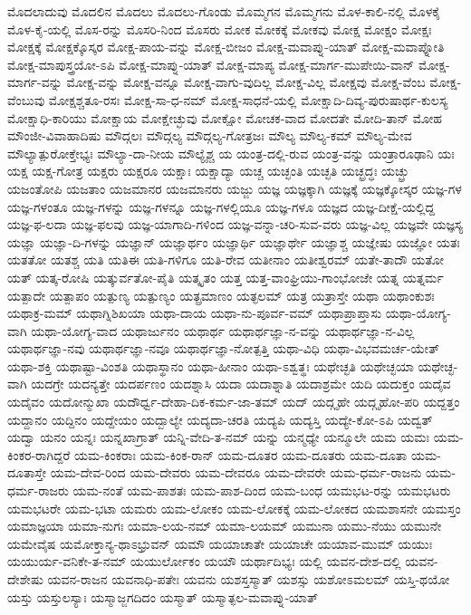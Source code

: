 {ಮೊದಲಾದುವು
ಮೊದಲಿನ
ಮೊದಲು
ಮೊದಲು-ಗೊಂಡು
ಮೊಮ್ಮಗನ
ಮೊಮ್ಮಗನು
ಮೊಳ-ಕಾಲಿ-ನಲ್ಲಿ
ಮೊಳಕೈ
ಮೊಳ-ಕೈ-ಯಲ್ಲಿ
ಮೊಸ-ರನ್ನು
ಮೊಸರಿ-ನಿಂದ
ಮೊಸರು
ಮೋಕ
ಮೋಕಕ್ಕೆ
ಮೋಕವು
ಮೋಕ್ಷ
ಮೋಕ್ಷಂ
ಮೋಕ್ಷಃ
ಮೋಕ್ಷಕ್ಕೆ
ಮೋಕ್ಷಕ್ಕೊಸ್ಕರ
ಮೋಕ್ಷ-ಪಾಯ-ವನ್ನು
ಮೋಕ್ಷ-ಬೀಜಂ
ಮೋಕ್ಷ-ಮವಾಪ್ನು-ಯಾತ್
ಮೋಕ್ಷ-ಮವಾಪ್ನೋತಿ
ಮೋಕ್ಷ-ಮಾಪುಸ್ತ್ರಯೋ-ಽಪಿ
ಮೋಕ್ಷ-ಮಾಪ್ನು-ಯಾತ್
ಮೋಕ್ಷ-ಮಾಪ್ಯ
ಮೋಕ್ಷ-ಮಾರ್ಗ-ಮುಪೇಯಿ-ವಾನ್
ಮೋಕ್ಷ-ಮಾರ್ಗ-ವನ್ನು
ಮೋಕ್ಷ-ವನ್ನು
ಮೋಕ್ಷ-ವನ್ನೂ
ಮೋಕ್ಷ-ವಾಗು-ವುದಿಲ್ಲ
ಮೋಕ್ಷ-ವಿಲ್ಲ
ಮೋಕ್ಷವು
ಮೋಕ್ಷ-ವೆಂಬ
ಮೋಕ್ಷ-ವೆಂಬುವು
ಮೋಕ್ಷಶ್ಚತೂ-ರಸಃ
ಮೋಕ್ಷ-ಸಾ-ಧ-ನಮ್
ಮೋಕ್ಷ-ಸಾಧನೆ-ಯಲ್ಲಿ
ಮೋಕ್ಷಾದಿ-ದಿವ್ಯ-ಪುರುಷಾರ್ಥ-ಕುಲಸ್ಯ
ಮೋಕ್ಷಾಧಿ-ಕಾರಿಯು
ಮೋಕ್ಷಾಯ
ಮೋಕ್ಷೇಚ್ಛುವು
ಮೋಕ್ಷೋ
ಮೋಚಕ-ವಾದ
ಮೋದತೇ
ಮೋದಿ-ತಾನ್
ಮೋಹ
ಮೌಂಜೀ-ವಿವಾಹಾದಿಷು
ಮೌದ್ಗಲಃ
ಮೌದ್ಗಲ್ಯ
ಮೌದ್ಗಲ್ಯ-ಗೋತ್ರಜಃ
ಮೌಲ್ಯ
ಮೌಲ್ಯ-ಕಮ್
ಮೌಲ್ಯ-ಮೇವ
ಮೌಲ್ಯಾತ್ಪುರೋಕ್ತೇಭ್ಯಃ
ಮೌಲ್ಯಾ-ದಾ-ನೀಯ
ಮೌಲ್ಯೈಶ್ಚ
ಯ
ಯಂತ್ರ-ದಲ್ಲಿ-ರುವ
ಯಂತ್ರ-ವನ್ನು
ಯಂತ್ರಾರೂಢಾನಿ
ಯಃ
ಯಕ್ಷ
ಯಕ್ಷ-ಗೋತ್ರ
ಯಕ್ಷರು
ಯಕ್ಷರೂ
ಯಕ್ಷಾಃ
ಯಕ್ಷಾದ್ಯಾ
ಯಚ್ಚ
ಯಚ್ಛಂತಿ
ಯಚ್ಛತಿ
ಯಚ್ಛ್ರದ್ಧಃ
ಯಚ್ಛ್ರು
ಯಜಂತೋಪಿ
ಯಜತಾಂ
ಯಜಮಾನರ
ಯಜಮಾನರು
ಯಜ್ಜು
ಯಜ್ಞ
ಯಜ್ಞಕ್ಕಾಗಿ
ಯಜ್ಞಕ್ಕೆ
ಯಜ್ಞಕ್ಕೋಸ್ಕರ
ಯಜ್ಞ-ಗಳ
ಯಜ್ಞ-ಗಳಂತೂ
ಯಜ್ಞ-ಗಳನ್ನು
ಯಜ್ಞ-ಗಳನ್ನೂ
ಯಜ್ಞ-ಗಳಲ್ಲಿಯೂ
ಯಜ್ಞ-ಗಳೂ
ಯಜ್ಞದ
ಯಜ್ಞ-ದೀಕ್ಷೆ-ಯಲ್ಲಿದ್ದ
ಯಜ್ಞ-ಫ-ಲದಾ
ಯಜ್ಞ-ಫಲವು
ಯಜ್ಞ-ಯಾಗಾದಿ-ಗಳಿಂದ
ಯಜ್ಞ-ವನ್ನಾ-ಚರಿ-ಸುವ-ವರು
ಯಜ್ಞ-ವಿಲ್ಲ
ಯಜ್ಞವೇ
ಯಜ್ಞಸ್ಯ
ಯಜ್ಞಾ
ಯಜ್ಞಾ-ದಿ-ಗಳನ್ನು
ಯಜ್ಞಾನ್
ಯಜ್ಞಾರ್ಥಂ
ಯಜ್ಞಾರ್ಥಿ
ಯಜ್ಞಾರ್ಥೇ
ಯಜ್ಞಾಶ್ಚ
ಯಜ್ಞೇಷು
ಯಜ್ಞೋ
ಯತಃ
ಯತತೋ
ಯತಶ್ಚ
ಯತಿ
ಯತಿಈ
ಯತಿ-ಗಳಿಗೂ
ಯತಿ-ರೇವ
ಯತೀನಾಂ
ಯತೀಶ್ವರಮ್
ಯತೇ-ತಾದೌ
ಯತೋ
ಯತ್
ಯತ್ಕ-ರೋಷಿ
ಯತ್ಕುರ್ವತೋ-ಪೈತಿ
ಯತ್ಕೃತಂ
ಯತ್ತ
ಯತ್ತ-ವಾಂಘ್ರಿಯು-ಗಾಂಭೋಜೇ
ಯತ್ನ
ಯತ್ನರ್ಮ
ಯತ್ಪಾದೇ
ಯತ್ಪಾಪಂ
ಯತ್ಪುಣ್ಯ
ಯತ್ಪುಣ್ಯಂ
ಯತ್ಪ್ರಮಾಣಂ
ಯತ್ಫಲಮ್
ಯತ್ರ
ಯತ್ರಾಸ್ತೇ
ಯಥಾ
ಯಥಾಂಕುಶಃ
ಯಥಾಕ್ರ-ಮಮ್
ಯಥಾಗ್ನಿಶಿಖಯಾ
ಯಥಾ-ದಾಯ
ಯಥಾ-ನು-ಪೂರ್ವ-ವಮ್
ಯಥಾಪ್ರಾಪ್ತಾಸು
ಯಥಾ-ಯೋಗ್ಯ-ವಾಗಿ
ಯಥಾ-ಯೋಗ್ಯ-ವಾದ
ಯಥಾರ್ಜುನಂ
ಯಥಾರ್ಥ
ಯಥಾರ್ಥಜ್ಞಾ-ನ-ವನ್ನು
ಯಥಾರ್ಥಜ್ಞಾ-ನ-ವಿಲ್ಲ
ಯಥಾರ್ಥಜ್ಞಾ-ನವು
ಯಥಾರ್ಥಜ್ಞಾ-ನವೂ
ಯಥಾರ್ಥಜ್ಞಾ-ನೋತ್ಪತ್ತಿ
ಯಥಾ-ವಿಧಿ
ಯಥಾ-ವಿಭವಮರ್ಚ-ಯೇತ್
ಯಥಾ-ಶಕ್ತಿ
ಯಥಾಷ್ಟಾ-ವಿಂಶತಿ
ಯಥಾಸ್ಥಾನಂ
ಯಥಾ-ಹೀನಾಂ
ಯಥಾ-ಽಶ್ವತ್ಥಃ
ಯಥೇಚ್ಛತಿ
ಯಥೇಚ್ಛಯಾ
ಯಥೇಚ್ಛ-ವಾಗಿ
ಯದಗ್ರೇ
ಯದನ್ಯತ್ತೇ
ಯದರ್ಪಣಂ
ಯದಶ್ನಾಸಿ
ಯದಾ
ಯದಾಶ್ನಾತಿ
ಯದಾಶ್ರಮೇ
ಯದಿ
ಯದುಕ್ತಂ
ಯದೈವ
ಯದೈವಂ
ಯದೋನ್ಮುಖಾ
ಯದೌರ್ಧ್ವ-ದೇಹಾ-ದಿಕ-ಕರ್ಮ-ಜಾ-ತಮ್
ಯದ್
ಯದ್ಗೃಹೇ
ಯದ್ಗೃಹೋ-ಪರಿ
ಯದ್ದತ್ತಂ
ಯದ್ದಾನಂ
ಯದ್ದಿನಂ
ಯದ್ದೇಯಂ
ಯದ್ಬಾಲ್ಯೇ
ಯದ್ಯದಾ-ಚರತಿ
ಯದ್ಯಪಿ
ಯದ್ಯಸ್ತಿ
ಯದ್ಯೇ-ಕೋ-ಽಪಿ
ಯದ್ವತ್
ಯದ್ವಾ
ಯನಂ
ಯನ್ನಃ
ಯನ್ನಖಾಗ್ರಾತ್
ಯನ್ನಿ-ವೇದಿ-ತ-ನಮ್
ಯನ್ನು
ಯನ್ಮಧ್ಯೇ
ಯನ್ಮೂಲೇ
ಯಮ
ಯಮಃ
ಯಮ-ಕಿಂಕರ-ರಾಗಿದ್ದರೆ
ಯಮ-ಕಿಂಕರಾಃ
ಯಮ-ಕಿಂಕ-ರಾನ್
ಯಮ-ದೂತರ
ಯಮ-ದೂತರು
ಯಮ-ದೂತಾ
ಯಮ-ದೂತಾಸ್ತೇ
ಯಮ-ದೇವ-ರಿಂದ
ಯಮ-ದೇವರು
ಯಮ-ದೇವರೂ
ಯಮ-ದೇವರೇ
ಯಮ-ಧರ್ಮ-ರಾಜನು
ಯಮ-ಧರ್ಮ-ರಾಜರು
ಯಮ-ನಂತೆ
ಯಮ-ಪಾಶತಃ
ಯಮ-ಪಾಶ-ದಿಂದ
ಯಮ-ಬಂಧ
ಯಮಭಟ-ರನ್ನು
ಯಮಭಟರು
ಯಮಭಟರೇ
ಯಮ-ಭಟಾ
ಯಮರು
ಯಮ-ಲೋಕಂ
ಯಮ-ಲೋಕಕ್ಕೆ
ಯಮ-ಲೋಕದ
ಯಮಶಾಸನೇ
ಯಮಸ್ತಂ
ಯಮಾಜ್ಞಯಾ
ಯಮಾ-ನುಗಃ
ಯಮಾ-ಲಯ-ನಮ್
ಯಮಾ-ಲಯಮ್
ಯಮುನಾ
ಯಮು-ನೆಯು
ಯಮುನೇ
ಯಮೇವೈಷ
ಯಮೋಕ್ತಾನ್ಯ-ಥಾಽಭ್ರುವನ್
ಯಮೌ
ಯಯಾಚಾತೇ
ಯಯಾಚೇ
ಯಯಾವ-ಮುಮ್
ಯಯುಃ
ಯಯುರ್ಯ-ವನಿಕೇ-ತ-ನಮ್
ಯಯುರ್ಲೋಕಂ
ಯಯೌ
ಯರ್ಥಾದಿಭ್ಯಃ
ಯಲ್ಲಿ
ಯವನ-ದೇಶ-ದಲ್ಲಿ
ಯವನ-ದೇಶೇಷು
ಯವನ-ರಾಜನ
ಯವನಾಧಿ-ಪತೇಃ
ಯವನು
ಯಶಸ್ತಸ್ಮಾತ್
ಯಶಸ್ಸು
ಯಶೋಽಮಲಮ್
ಯಸ್ತಿ-ಥಯೋ
ಯಸ್ತು
ಯಸ್ತುಲಸ್ಯಾಃ
ಯಸ್ಮಾಜ್ಜಗದಿದಂ
ಯಸ್ಮಾತ್
ಯಸ್ಮಾತ್ಫಲ-ಮವಾಪ್ನು-ಯಾತ್
}
